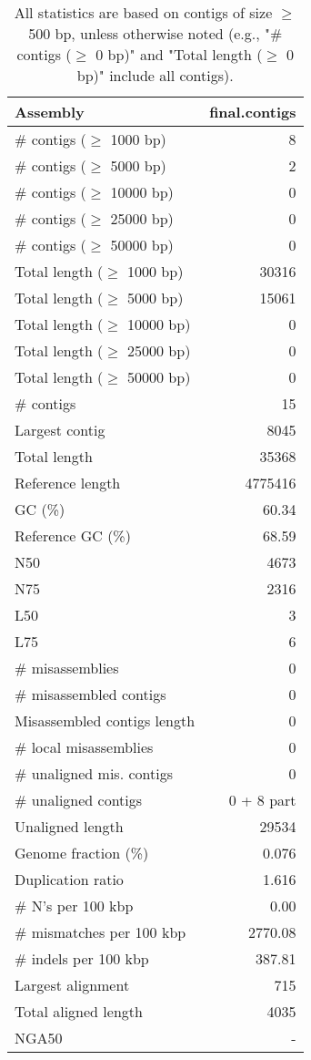 \documentclass[12pt,a4paper]{article}
\begin{document}
\begin{table}[ht]
\begin{center}
\caption{All statistics are based on contigs of size $\geq$ 500 bp, unless otherwise noted (e.g., "\# contigs ($\geq$ 0 bp)" and "Total length ($\geq$ 0 bp)" include all contigs).}
\begin{tabular}{|l*{1}{|r}|}
\hline
Assembly & final.contigs \\ \hline
\# contigs ($\geq$ 1000 bp) & 8 \\ \hline
\# contigs ($\geq$ 5000 bp) & 2 \\ \hline
\# contigs ($\geq$ 10000 bp) & 0 \\ \hline
\# contigs ($\geq$ 25000 bp) & 0 \\ \hline
\# contigs ($\geq$ 50000 bp) & 0 \\ \hline
Total length ($\geq$ 1000 bp) & 30316 \\ \hline
Total length ($\geq$ 5000 bp) & 15061 \\ \hline
Total length ($\geq$ 10000 bp) & 0 \\ \hline
Total length ($\geq$ 25000 bp) & 0 \\ \hline
Total length ($\geq$ 50000 bp) & 0 \\ \hline
\# contigs & 15 \\ \hline
Largest contig & 8045 \\ \hline
Total length & 35368 \\ \hline
Reference length & 4775416 \\ \hline
GC (\%) & 60.34 \\ \hline
Reference GC (\%) & 68.59 \\ \hline
N50 & 4673 \\ \hline
N75 & 2316 \\ \hline
L50 & 3 \\ \hline
L75 & 6 \\ \hline
\# misassemblies & 0 \\ \hline
\# misassembled contigs & 0 \\ \hline
Misassembled contigs length & 0 \\ \hline
\# local misassemblies & 0 \\ \hline
\# unaligned mis. contigs & 0 \\ \hline
\# unaligned contigs & 0 + 8 part \\ \hline
Unaligned length & 29534 \\ \hline
Genome fraction (\%) & 0.076 \\ \hline
Duplication ratio & 1.616 \\ \hline
\# N's per 100 kbp & 0.00 \\ \hline
\# mismatches per 100 kbp & 2770.08 \\ \hline
\# indels per 100 kbp & 387.81 \\ \hline
Largest alignment & 715 \\ \hline
Total aligned length & 4035 \\ \hline
NGA50 & - \\ \hline
\end{tabular}
\end{center}
\end{table}
\end{document}
